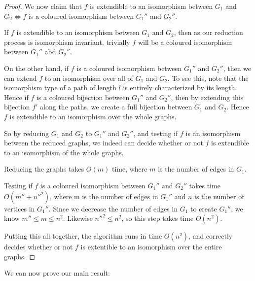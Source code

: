 \documentclass[11pt]{report}
\begin{document}
\begin{proof}
We now claim that $f$ is extendible to an isomorphism between $G_1$ and $G_2 \Leftrightarrow f$ is a coloured isomorphism between $G_1''$ and $G_2''$. 

If $f$ is extendible to an isomorphism between $G_1$ and $G_2$, then as our reduction process is isomorphism invariant, trivially $f$ will be a coloured isomorphism between $G_1''$ abd $G_2''$.

On the other hand, if $f$ is a coloured isomorphism between $G_1''$ and $G_2''$, then we can extend $f$ to an isomorphism over all of $G_1$ and $G_2$. To see this, note that the isomorphism type of a path of length $l$ is entirely characterized by its length. Hence if $f$ is a coloured bijection between $G_1''$ and $G_2''$, then by extending this bijection $f'$ along the paths, we create a full bijection between $G_1$ and $G_2$. Hence $f$ is extendible to an isomorphism over the whole graphs.







So by reducing $G_1$ and $G_2$ to $G_1''$ and $G_2''$, and testing if $f$ is an isomorphism between the reduced graphs, we indeed can decide whether or not $f$ is extendible to an isomorphism of the whole graphs.

Reducing the graphs takes $O(m)$ time, where $m$ is the number of edges in $G_1$. 

Testing if $f$ is a coloured isomorphism between $G_1''$ and $G_2''$ takes time $O(m''+n''^2)$, where m is the number of edges in $G_1''$ and $n$ is the number of vertices in $G_1''$. Since we decrease the number of edges in $G_1$ to create $G_1''$, we know $m''\leq m \leq n^2$. Likewise $n''^2 \leq n^2$, so this step takes time $O(n^2)$.

Putting this all together, the algorithm runs in time $O(n^2)$, and correctly decides whether or not $f$ is extentible to an isomorphism over the entire graphs.

\end{proof}

We can now prove our main result:
\end{document}
